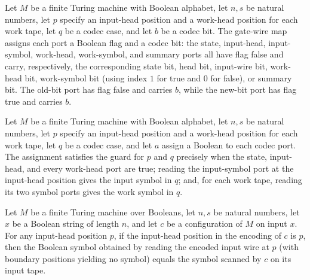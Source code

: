 \begin{definition}
\label{Complexity.codecGateWire}
\leanok
{}
Let $M$ be a finite Turing machine with Boolean alphabet, let $n,s$ be natural numbers,
let $p$ specify an input-head position and a work-head position for each work tape, let
$q$ be a codec case, and let $b$ be a codec bit. The gate-wire map assigns each port a
Boolean flag and a codec bit: the state, input-head, input-symbol, work-head,
work-symbol, and summary ports all have flag false and carry, respectively, the
corresponding state bit, head bit, input-wire bit, work-head bit, work-symbol bit (using
index $1$ for true and $0$ for false), or summary bit. The old-bit port has flag false
and carries $b$, while the new-bit port has flag true and carries $b$.
\end{definition}

\begin{definition}
\label{Complexity.codecGuard}
\leanok
{}
Let $M$ be a finite Turing machine with Boolean alphabet, let $n,s$ be natural numbers,
let $p$ specify an input-head position and a work-head position for each work tape, let
$q$ be a codec case, and let $a$ assign a Boolean to each codec port. The assignment
satisfies the guard for $p$ and $q$ precisely when the state, input-head, and every
work-head port are true; reading the input-symbol port at the input-head position gives
the input symbol in $q$; and, for each work tape, reading its two symbol ports gives the
work symbol in $q$.
\end{definition}

\begin{theorem}
\label{Complexity.codecInputRead_wire}
\leanok
{}
Let $M$ be a finite Turing machine over Booleans, let $n,s$ be natural numbers, let $x$
be a Boolean string of length $n$, and let $c$ be a configuration of $M$ on input $x$.
For any input-head position $p$, if the input-head position in the encoding of $c$ is
$p$, then the Boolean symbol obtained by reading the encoded input wire at $p$ (with
boundary positions yielding no symbol) equals the symbol scanned by $c$ on its input
tape.
\end{theorem}

